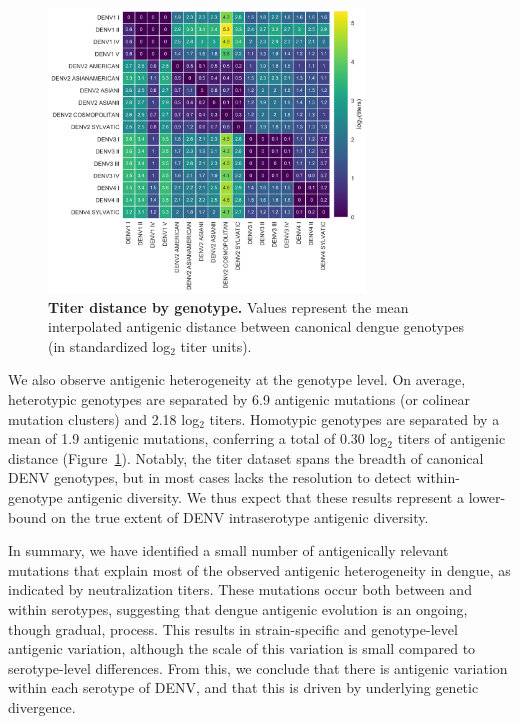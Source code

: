 \documentclass[11pt,oneside,letterpaper]{article}
\begin{document}
\begin{figure}[ht]
\centering
	\includegraphics[width=0.75\textwidth]{../figures/png/genotype_dTiter_heatmap.png}
	\caption{\textbf{Titer distance by genotype.}
  Values represent the mean interpolated antigenic distance between canonical dengue genotypes (in standardized log$_2$ titer units).
  }
	\label{genotype_dTiter_heatmap}
\end{figure}

We also observe antigenic heterogeneity at the genotype level.
On average, heterotypic genotypes are separated by 6.9 antigenic mutations (or colinear mutation clusters) and 2.18 log$_2$ titers.
Homotypic genotypes are separated by a mean of 1.9 antigenic mutations, conferring a total of 0.30 log$_2$ titers of antigenic distance (Figure~\ref{genotype_dTiter_heatmap}).
Notably, the titer dataset spans the breadth of canonical DENV genotypes, but in most cases lacks the resolution to detect within-genotype antigenic diversity.
We thus expect that these results represent a lower-bound on the true extent of DENV intraserotype antigenic diversity.

In summary, we have identified a small number of antigenically relevant mutations that explain most of the observed antigenic heterogeneity in dengue, as indicated by neutralization titers.
These mutations occur both between and within serotypes, suggesting that dengue antigenic evolution is an ongoing, though gradual, process.
This results in strain-specific and genotype-level antigenic variation, although the scale of this variation is small compared to serotype-level differences.
From this, we conclude that there is antigenic variation within each serotype of DENV, and that this is driven by underlying genetic divergence.
\end{document}
